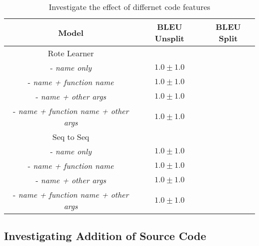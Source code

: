 \begin{table}[h!]
\begin{center}
\begin{tabular}{ c | c | c }
    Model                               & BLEU Unsplit            & BLEU Split  \\
    \hline
    \hline
    Rote Learner                        &                  & \\    
    - \textit{name only}                & $1.0 \pm 1.0 $   & \\
    - \textit{name + function name}     & $1.0 \pm 1.0 $   & \\
    - \textit{name + other args}        & $1.0 \pm 1.0 $   & \\
    - \textit{name + function name + other args}     & $1.0 \pm 1.0 $   & \\
    \hline
    \hline
    Seq to Seq                          &                  &  \\
    - \textit{name only}                & $1.0 \pm 1.0 $   & \\
    - \textit{name + function name}     & $1.0 \pm 1.0 $   & \\
    - \textit{name + other args}        & $1.0 \pm 1.0 $   & \\
    - \textit{name + function name + other args}     & $1.0 \pm 1.0 $   & \\
    \hline
\end{tabular}
\caption {Investigate the effect of differnet code features}
\label{table:tokenization}
\end{center}
\end{table}




\subsection{Investigating Addition of Source Code} %
\label{subs:investigating_tokenizations_with_source_code}

